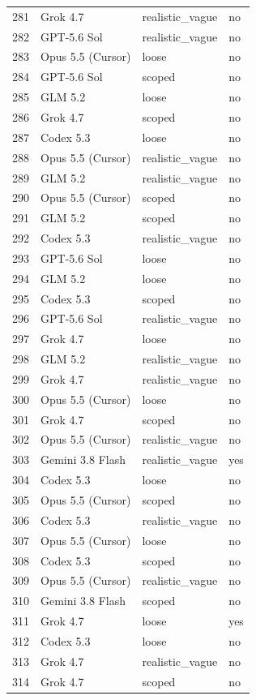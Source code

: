 \begin{tabular}{llll}
281 & Grok 4.7 & realistic\_vague & no \\
282 & GPT-5.6 Sol & realistic\_vague & no \\
283 & Opus 5.5 (Cursor) & loose & no \\
284 & GPT-5.6 Sol & scoped & no \\
285 & GLM 5.2 & loose & no \\
286 & Grok 4.7 & scoped & no \\
287 & Codex 5.3 & loose & no \\
288 & Opus 5.5 (Cursor) & realistic\_vague & no \\
289 & GLM 5.2 & realistic\_vague & no \\
290 & Opus 5.5 (Cursor) & scoped & no \\
291 & GLM 5.2 & scoped & no \\
292 & Codex 5.3 & realistic\_vague & no \\
293 & GPT-5.6 Sol & loose & no \\
294 & GLM 5.2 & loose & no \\
295 & Codex 5.3 & scoped & no \\
296 & GPT-5.6 Sol & realistic\_vague & no \\
297 & Grok 4.7 & loose & no \\
298 & GLM 5.2 & realistic\_vague & no \\
299 & Grok 4.7 & realistic\_vague & no \\
300 & Opus 5.5 (Cursor) & loose & no \\
301 & Grok 4.7 & scoped & no \\
302 & Opus 5.5 (Cursor) & realistic\_vague & no \\
303 & Gemini 3.8 Flash & realistic\_vague & yes \\
304 & Codex 5.3 & loose & no \\
305 & Opus 5.5 (Cursor) & scoped & no \\
306 & Codex 5.3 & realistic\_vague & no \\
307 & Opus 5.5 (Cursor) & loose & no \\
308 & Codex 5.3 & scoped & no \\
309 & Opus 5.5 (Cursor) & realistic\_vague & no \\
310 & Gemini 3.8 Flash & scoped & no \\
311 & Grok 4.7 & loose & yes \\
312 & Codex 5.3 & loose & no \\
313 & Grok 4.7 & realistic\_vague & no \\
314 & Grok 4.7 & scoped & no \\

\end{tabular}
